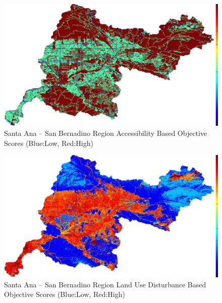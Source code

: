         \begin{figure}[!h]
            \begin{center}
            \includegraphics[width=5.5in]{figures/SanBernadino_AccessibilityScore.png}   
            \caption{Santa Ana -- San Bernadino Region Accessibility Based Objective Scores (Blue:Low, Red:High)}
            \label{fig:SASBaccessibilty}
            \end{center}
        \end{figure}

        \begin{figure}[!h]
            \begin{center}
            \includegraphics[width=5.5in]{figures/SanBernadino_DisturbanceScore.png}   
            \caption{Santa Ana -- San Bernadino Region Land Use Disturbance Based Objective Scores (Blue:Low, Red:High)}
            \label{fig:SASBdisturbance}
            \end{center}
        \end{figure}
        
